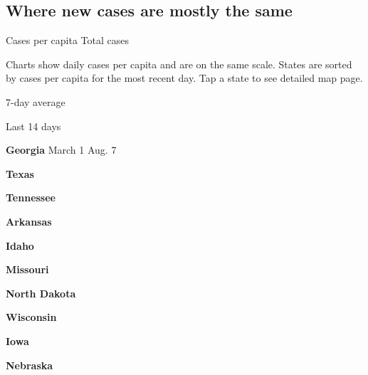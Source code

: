 \hypertarget{where-new-cases-are-mostly-the-same}{%
\subsection{Where new cases are mostly the
same}\label{where-new-cases-are-mostly-the-same}}

Cases per capita Total cases

Charts show daily cases per capita and are on the same scale. States are
sorted by cases per capita for the most recent day. Tap a state to see
detailed map page.

\href{https://www.nytimes.com/interactive/2020/us/georgia-coronavirus-cases.html}{}

7-day average

Last 14 days

\textbf{Georgia} March 1 Aug. 7

\href{https://www.nytimes.com/interactive/2020/us/texas-coronavirus-cases.html}{}

\textbf{Texas}

\href{https://www.nytimes.com/interactive/2020/us/tennessee-coronavirus-cases.html}{}

\textbf{Tennessee}

\href{https://www.nytimes.com/interactive/2020/us/arkansas-coronavirus-cases.html}{}

\textbf{Arkansas}

\href{https://www.nytimes.com/interactive/2020/us/idaho-coronavirus-cases.html}{}

\textbf{Idaho}

\href{https://www.nytimes.com/interactive/2020/us/missouri-coronavirus-cases.html}{}

\textbf{Missouri}

\href{https://www.nytimes.com/interactive/2020/us/north-dakota-coronavirus-cases.html}{}

\textbf{North Dakota}

\href{https://www.nytimes.com/interactive/2020/us/wisconsin-coronavirus-cases.html}{}

\textbf{Wisconsin}

\href{https://www.nytimes.com/interactive/2020/us/iowa-coronavirus-cases.html}{}

\textbf{Iowa}

\href{https://www.nytimes.com/interactive/2020/us/nebraska-coronavirus-cases.html}{}

\textbf{Nebraska}

\href{https://www.nytimes.com/interactive/2020/us/kansas-coronavirus-cases.html}{}

